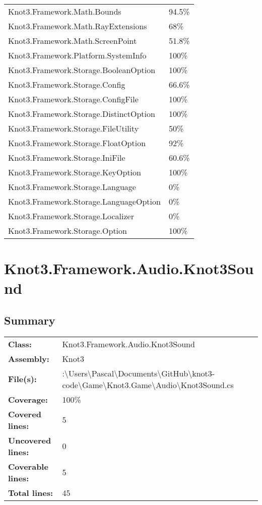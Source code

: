 \documentclass[a4paper,10pt]{article}
\begin{document}
\begin{longtable}[l]{ll}
Knot3.Framework.Math.Bounds & 94.5\%\\
Knot3.Framework.Math.RayExtensions & 68\%\\
Knot3.Framework.Math.ScreenPoint & 51.8\%\\
Knot3.Framework.Platform.SystemInfo & 100\%\\
Knot3.Framework.Storage.BooleanOption & 100\%\\
Knot3.Framework.Storage.Config & 66.6\%\\
Knot3.Framework.Storage.ConfigFile & 100\%\\
Knot3.Framework.Storage.DistinctOption & 100\%\\
Knot3.Framework.Storage.FileUtility & 50\%\\
Knot3.Framework.Storage.FloatOption & 92\%\\
Knot3.Framework.Storage.IniFile & 60.6\%\\
Knot3.Framework.Storage.KeyOption & 100\%\\
Knot3.Framework.Storage.Language & 0\%\\
Knot3.Framework.Storage.LanguageOption & 0\%\\
Knot3.Framework.Storage.Localizer & 0\%\\
Knot3.Framework.Storage.Option & 100\%\\
\end{longtable}
\newpage
\section{Knot3.Framework.Audio.Knot3Sound}
\subsection{Summary}
\begin{longtable}[l]{ll}
\textbf{Class:} & Knot3.Framework.Audio.Knot3Sound\\
\textbf{Assembly:} & Knot3\\
\textbf{File(s):} & \begin{minipage}[t]{12cm}{:\textbackslash Users\textbackslash Pascal\textbackslash Documents\textbackslash GitHub\textbackslash knot3-code\textbackslash Game\textbackslash Knot3.Game\textbackslash Audio\textbackslash Knot3Sound.cs}\end{minipage} \\
\textbf{Coverage:} & 100\%\\
\textbf{Covered lines:} & 5\\
\textbf{Uncovered lines:} & 0\\
\textbf{Coverable lines:} & 5\\
\textbf{Total lines:} & 45\\
\end{longtable}
\end{document}
